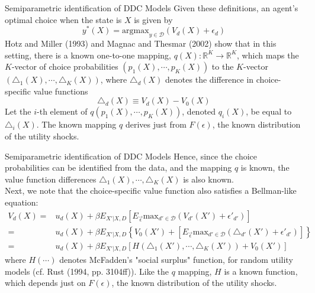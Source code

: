 \begin{frame}{Semiparametric identification of DDC Models}
Given these definitions, an agent's optimal choice when the state is $X$ is given by 
\begin{equation*}
y^* (X) = \text{argmax}_{y \in \mathcal{D}} (V_d(X) + \epsilon_d)
\end{equation*}
Hotz and Miller (1993) and Magnac and Thesmar (2002) show that in this setting, there is a known one-to-one mapping, $q(X) : \mathbb{R}^K \rightarrow \mathbb{R}^K$, which maps the $K$-vector of choice probabilities $(p_1(X), \cdots , p_K(X))$ to the $K$-vector $(\triangle_1(X), \cdots , \triangle_K (X))$, where $\triangle_d(X)$ denotes the difference in choice-specific value functions
\begin{equation*}
\triangle_d(X) \equiv V_d(X) - V_0(X)
\end{equation*}
Let the $i$-th element of $q(p_1(X), \cdots, p_K(X))$, denoted $q_i(X)$, be equal to $\triangle_i(X)$. The known mapping $q$ derives just from $F(\epsilon)$, the known distribution of the utility shocks. \\
\end{frame}

\begin{frame}{Semiparametric identification of DDC Models}
Hence, since the choice probabilities can be identified from the data, and the mapping $q$ is known, the value function differences $\triangle_1(X), \cdots, \triangle_K(X)$ is also known. \\
\vspace{2mm}
Next, we note that the choice-specific value function also satisfies a Bellman-like equation:
\begin{equation}
\begin{split}
V_d(X) = & u_d(X) + \beta E_{X'|X,D} \left [ E_{\vec{\epsilon}} \text{max}_{d' \in \mathcal{D}} (V_{d'} (X') + \epsilon'_{d'}) \right ] \\
= & u_d(X) + \beta E_{X'|X,D} \left \{ V_0 (X') + \left [ E_{\vec{\epsilon}} \text{max}_{d' \in \mathcal{D}} (\triangle_{d'} (X') + \epsilon'_{d'}) \right ] \right \} \\
= & u_d(X) + \beta E_{X'|X,D} [ H(\triangle_1 (X'), \cdots, \triangle_K(X')) + V_0(X') ]
\end{split}
\end{equation}
where $H(\cdots)$ denotes McFadden's "social surplus" function, for random utility models (cf. Rust (1994, pp. 3104ff)). Like the $q$ mapping, $H$ is a known function, which depends just on $F(\epsilon)$, the known distribution of the utility shocks. 
\end{frame}

